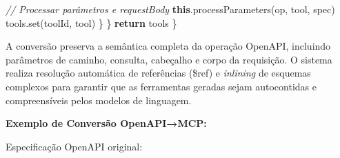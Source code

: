 \documentclass[
]{article}
\newenvironment{Shaded}{}{}
\newcommand{\AttributeTok}[1]{\textcolor[rgb]{0.49,0.56,0.16}{#1}}
\newcommand{\CharTok}[1]{\textcolor[rgb]{0.25,0.44,0.63}{#1}}
\newcommand{\CommentTok}[1]{\textcolor[rgb]{0.38,0.63,0.69}{\textit{#1}}}
\newcommand{\ControlFlowTok}[1]{\textcolor[rgb]{0.00,0.44,0.13}{\textbf{#1}}}
\newcommand{\FunctionTok}[1]{\textcolor[rgb]{0.02,0.16,0.49}{#1}}
\newcommand{\KeywordTok}[1]{\textcolor[rgb]{0.00,0.44,0.13}{\textbf{#1}}}
\newcommand{\NormalTok}[1]{#1}
\newcommand{\OperatorTok}[1]{\textcolor[rgb]{0.40,0.40,0.40}{#1}}
\newcommand{\StringTok}[1]{\textcolor[rgb]{0.25,0.44,0.63}{#1}}
\begin{document}
\begin{Shaded}
\begin{Highlighting}[]
      \CommentTok{// Processar parâmetros e requestBody}
      \KeywordTok{this}\OperatorTok{.}\FunctionTok{processParameters}\NormalTok{(op}\OperatorTok{,}\NormalTok{ tool}\OperatorTok{,}\NormalTok{ spec)}
\NormalTok{      tools}\OperatorTok{.}\FunctionTok{set}\NormalTok{(toolId}\OperatorTok{,}\NormalTok{ tool)}
\NormalTok{    \}}
\NormalTok{  \}}
  \ControlFlowTok{return}\NormalTok{ tools}
\NormalTok{\}}
\end{Highlighting}
\end{Shaded}

A conversão preserva a semântica completa da operação OpenAPI, incluindo
parâmetros de caminho, consulta, cabeçalho e corpo da requisição. O
sistema realiza resolução automática de referências (\$ref) e
\emph{inlining} de esquemas complexos para garantir que as ferramentas
geradas sejam autocontidas e compreensíveis pelos modelos de linguagem.

\textbf{Exemplo de Conversão OpenAPI→MCP:}

Especificação OpenAPI original:

\begin{Shaded}
\end{Shaded}
\end{document}
